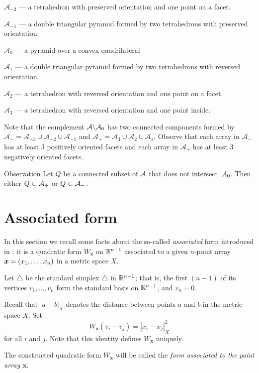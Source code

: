 \documentclass{article}
\begin{document}
$\mathcal{A}_{-2}$ --- a tetrahedron with preserved orientation and one point on a facet.

$\mathcal{A}_{-1}$ --- a double triangular pyramid formed by two tetrahedrons with preserved orientation.

$\mathcal{A}_{0}$ --- a pyramid over a convex quadrilateral 

$\mathcal{A}_{1}$ --- a double triangular pyramid formed by two tetrahedrons with reversed orientation.

$\mathcal{A}_{2}$ --- a tetrahedron with reversed orientation and one point on a facet.

$\mathcal{A}_{3}$ --- a tetrahedron with reversed orientation and one point inside.

Note that the complement $\mathcal{A}\backslash \mathcal{A}_0$ has two connected components formed by $\mathcal{A}_{-}=\mathcal{A}_{-3}\cup \mathcal{A}_{-2}\cup\mathcal{A}_{-1}$ and $\mathcal{A}_{+}=\mathcal{A}_{3}\cup \mathcal{A}_{2}\cup\mathcal{A}_{1}$.
Observe that each array in $\mathcal{A}_{-}$ has at least 3 positively oriented facets and each array in $\mathcal{A}_{+}$ has at least 3 negatively oriented facets.

\begin{thm}{Observation}\label{obs:connectedA}
Let $Q$ be a connected subset of $\mathcal{A}$ that does not intersect~$\mathcal{A}_0$.
Then either $Q\subset \mathcal{A}_+$ or $Q\subset \mathcal{A}_-$.
\end{thm}


\section{Associated form}

In this section we recall some facts about the so-called \emph{associated} form introduced in \cite{petrunin-2017};
it is a quadratic form 
$W_{\bm{x}}$ on $\mathbb{R}^{n-1}$ associated
to a given $n$-point array $\bm{x}\z=(x_1,\dots,x_n)$ in a metric space $X$.

Let $\triangle$ be the standard simplex $\triangle$ in $\mathbb{R}^{n-1}$; that is, the first $(n-1)$ of its vertices $v_1,\dots,v_n$ form the standard basis on $\mathbb{R}^{n-1}$,
 and $v_n=0$.

Recall that $|a-b|_X$ denotes the distance between points $a$ and $b$ in the metric space $X$.
Set
\[W_{\bm{x}}(v_i-v_j)=|x_i-x_j|^2_X\] 
for all $i$ and $j$.
Note that this identity defines $W_{\bm{x}}$ uniquely.


The constructed quadratic form $W_{\bm{x}}$ will be called the \emph{form associated to the point array $\bm{x}$}.
\end{document}

